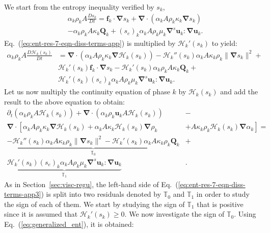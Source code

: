 \documentclass[preprint,10pt]{elsarticle}
\renewcommand{\div}{\mbold{\nabla}\! \cdot \!}
\newcommand{\grad}{\mbold{\nabla}}
\newcommand{\mbold}[1]{\boldsymbol#1}
\newcommand{\eqt}[1]{Eq.~(\ref{#1})}                     %
\newcommand{\sct}[1]{Section~\ref{#1}}                   %
\begin{document}
\begin{appendices}
We start from the entropy inequality verified by $s_k$,
%
\begin{align}\label{eq:ent-res-7-eqn-diss-terms-app}
&\alpha_k \rho_k A \frac{Ds_k}{Dt} =  \mbold f_k \cdot \grad s_k + \div \left( \alpha_k A \rho_k \kappa_k  \grad s_k \right)  \nonumber\\
&- \alpha_k \rho_k A \kappa_k \mathbf{Q}_k + (s_e)_k \alpha_k A \rho_k \mu_k \grad^s \mbold u_k : \grad \mbold u_k.
\end{align}
%
\eqt{eq:ent-res-7-eqn-diss-terms-app} is multiplied by $\mathscr{H}_k'(s_k)$ to yield:
%
\begin{align}\label{eq:ent-res-7-eqn-diss-terms-app2}
\alpha_k \rho_k A \frac{D\mathscr{H}_k(s_k)}{Dt} &= \div \left( \alpha_k A \rho_k \kappa_k \grad \mathscr{H}_k (s_k) \right) - \mathscr{H}_k''(s_k) \alpha_k A \kappa_k \rho_k \| \grad s_k \|^2 + \nonumber\\
&\mathscr{H}_k'(s_k) \mbold f_k \cdot \grad s_k - \mathscr{H}_k'(s_k)\alpha_k \rho_k A \kappa_k \mathbf{Q}_k + \nonumber \\
& \mathscr{H}_k'(s_k)(s_e)_k \alpha_k A \rho_k \mu_k \grad^s \mbold u_k : \grad \mbold u_k.
\end{align}
%
Let us now multiply the continuity equation of phase $k$ by $\mathscr{H}_k (s_k)$ and add the result to the above equation to obtain:
%
\begin{align}\label{eq:ent-res-7-eqn-diss-terms-app3}
\partial_t \left( \alpha_k \rho_k A \mathscr{H}_k(s_k)\right) + \div \left( \alpha_k \rho_k \mbold u_k A \mathscr{H}_k(s_k) \right)  &- \nonumber\\
\div \left[ \alpha_k A \rho_k \kappa_k \grad \mathscr{H}_k (s_k) + \alpha_k A \kappa_k \mathscr{H}_k (s_k) \grad \rho_k  \right. & \left. + A \kappa_k \rho_k \mathscr{H}_k (s_k) \grad \alpha_k\right] = \nonumber \\
 \underbrace{-\mathscr{H}_k''(s_k) \alpha_k A \kappa_k \rho_k \| \grad s_k \|^2  - \mathscr{H}_k'(s_k) \alpha_k A \kappa_k \rho_k  \mathbf{Q}_k}_{\mathbb{T}_0} &+\nonumber \\
\underbrace{ \mathscr{H}_k'(s_k)(s_e)_k  \alpha_k A \rho_k \mu_k \grad^s \mbold u_k : \grad \mbold u_k}_{\mathbb{T}_1} & .
\end{align}
%
As in \sct{sec:visc-regu}, the left-hand side of \eqt{eq:ent-res-7-eqn-diss-terms-app3} is split into two residuals denoted by $\mathbb{T}_0$ and $\mathbb{T}_1$ in order to study the sign of each of them. We start by studying the sign of $\mathbb{T}_1$ that is positive since it is assumed that $ \mathscr{H}_k'(s_k) \geq 0$. We now investigate the sign of $\mathbb{T}_0$. Using \eqt{eq:generalized_ent}, it is obtained:

\end{appendices}
\end{document}

